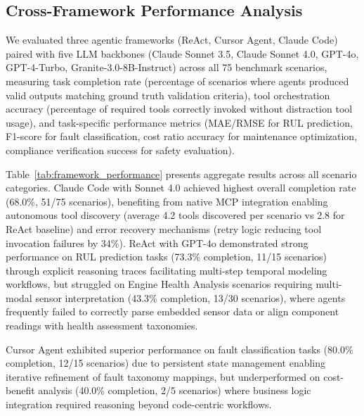 \documentclass[sigconf,review]{acmart}
\begin{document}
\subsection{Cross-Framework Performance Analysis}

  We evaluated three agentic frameworks (ReAct, Cursor Agent, Claude Code)   
  paired with five LLM backbones (Claude Sonnet 3.5, Claude Sonnet 4.0,      
  GPT-4o, GPT-4-Turbo, Granite-3.0-8B-Instruct) across all 75 benchmark      
  scenarios, measuring task completion rate (percentage of scenarios where   
  agents produced valid outputs matching ground truth validation criteria),  
  tool orchestration accuracy (percentage of required tools correctly invoked
   without distraction tool usage), and task-specific performance metrics    
  (MAE/RMSE for RUL prediction, F1-score for fault classification, cost ratio
   accuracy for maintenance optimization, compliance verification success for
   safety evaluation). 
   
   Table~\ref{tab:framework_performance} presents        
  aggregate results across all scenario categories. Claude Code with Sonnet  
  4.0 achieved highest overall completion rate (68.0\%, 51/75 scenarios),    
  benefiting from native MCP integration enabling autonomous tool discovery  
  (average 4.2 tools discovered per scenario vs 2.8 for ReAct baseline) and  
  error recovery mechanisms (retry logic reducing tool invocation failures by
   34\%). ReAct with GPT-4o demonstrated strong performance on RUL prediction
   tasks (73.3\% completion, 11/15 scenarios) through explicit reasoning     
  traces facilitating multi-step temporal modeling workflows, but struggled  
  on Engine Health Analysis scenarios requiring multi-modal sensor           
  interpretation (43.3\% completion, 13/30 scenarios), where agents          
  frequently failed to correctly parse embedded sensor data or align         
  component readings with health assessment taxonomies. 
  
  Cursor Agent         
  exhibited superior performance on fault classification tasks (80.0\%       
  completion, 12/15 scenarios) due to persistent state management enabling   
  iterative refinement of fault taxonomy mappings, but underperformed on     
  cost-benefit analysis (40.0\% completion, 2/5 scenarios) where business    
  logic integration required reasoning beyond code-centric workflows. 
  
\end{document}
